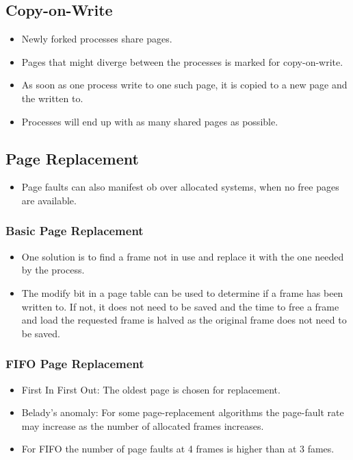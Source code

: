 \documentclass[a4wide,10pt]{article}
\begin{document}
\subsection{Copy-on-Write} %
\label{sub:copy_on_write}
	\begin{itemize}
		\item Newly forked processes share pages.
		\item Pages that might diverge between the processes is marked for copy-on-write.
		\item As soon as one process write to one such page, it is copied to a new page and the written to.
		\item Processes will end up with as many shared pages as possible.
	\end{itemize}

\subsection{Page Replacement} %
\label{sub:page_replacement}
\begin{itemize}
	\item Page faults can also manifest ob over allocated systems, when no free pages are available.
\end{itemize}

	\subsubsection{Basic Page Replacement} %
	\label{ssub:basic_page_replacement}
	\begin{itemize}
		\item One solution is to find a frame not in use and replace it with the one needed by the process.
		\item The modify bit in a page table can be used to determine if a frame has been written to. If not, it does not need to be saved and the time to free a frame and load the requested frame is halved as the original frame does not need to be saved.
	\end{itemize}
	
	\subsubsection{FIFO Page Replacement} %
	\label{ssub:fifo_page_replacement}
	\begin{itemize}
		\item First In First Out: The oldest page is chosen for replacement.
		\item Belady's anomaly: For some page-replacement algorithms the page-fault rate may increase as the number of allocated frames increases.
		\item For FIFO the number of page faults at 4 frames is higher than at 3 fames.
	\end{itemize}
	
\end{document}

